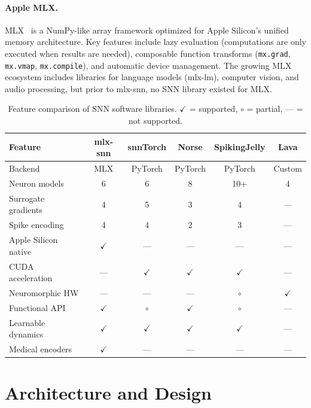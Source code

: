 \documentclass[11pt]{article}
\begin{document}
\paragraph{Apple MLX.}
MLX~\citep{mlx2023} is a NumPy-like array framework optimized for Apple Silicon's unified memory architecture. Key features include lazy evaluation (computations are only executed when results are needed), composable function transforms (\texttt{mx.grad}, \texttt{mx.vmap}, \texttt{mx.compile}), and automatic device management. The growing MLX ecosystem includes libraries for language models (mlx-lm), computer vision, and audio processing, but prior to mlx-snn, no SNN library existed for MLX.

\begin{table}[t]
\centering
\caption{Feature comparison of SNN software libraries. $\checkmark$ = supported, $\circ$ = partial, --- = not supported.}
\label{tab:comparison}
\small
\begin{tabular}{lccccc}
\toprule
\textbf{Feature} & \textbf{mlx-snn} & \textbf{snnTorch} & \textbf{Norse} & \textbf{SpikingJelly} & \textbf{Lava} \\
\midrule
Backend & MLX & PyTorch & PyTorch & PyTorch & Custom \\
Neuron models & 6 & 6 & 8 & 10+ & 4 \\
Surrogate gradients & 4 & 5 & 3 & 4 & --- \\
Spike encoding & 4 & 4 & 2 & 3 & --- \\
Apple Silicon native & $\checkmark$ & --- & --- & --- & --- \\
CUDA acceleration & --- & $\checkmark$ & $\checkmark$ & $\checkmark$ & --- \\
Neuromorphic HW & --- & --- & --- & $\circ$ & $\checkmark$ \\
Functional API & $\checkmark$ & $\circ$ & $\checkmark$ & $\circ$ & --- \\
Learnable dynamics & $\checkmark$ & $\checkmark$ & $\checkmark$ & $\checkmark$ & --- \\
Medical encoders & $\checkmark$ & --- & --- & --- & --- \\
\bottomrule
\end{tabular}
\end{table}

\section{Architecture and Design}
\end{document}
